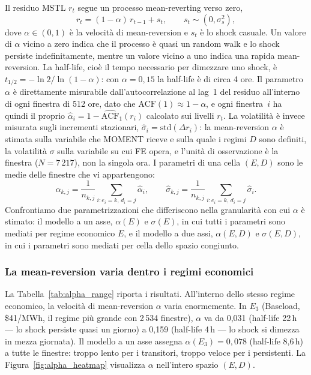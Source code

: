 \documentclass[12pt]{article}
\begin{document}
Il residuo MSTL $r_t$ segue un processo mean-reverting verso zero,
\begin{equation}
r_t = (1 - \alpha)\, r_{t-1} + s_t, \qquad s_t \sim (0, \sigma_s^2),
\label{eq:mean_reverting}
\end{equation}
dove $\alpha \in (0, 1)$ è la velocità di mean-reversion e $s_t$ è lo shock casuale.
Un valore di $\alpha$ vicino a zero indica che il processo è quasi un random walk e lo shock persiste indefinitamente, mentre un valore vicino a uno indica una rapida mean-reversion.
La half-life, cioè il tempo necessario per dimezzare uno shock, è $t_{1/2} = -\ln 2 / \ln(1-\alpha)$: con $\alpha = 0{,}15$ la half-life è di circa 4 ore.
Il parametro $\alpha$ è direttamente misurabile dall'autocorrelazione al lag~1 del residuo all'interno di ogni finestra di 512 ore, dato che $\text{ACF}(1) \approx 1 - \alpha$, e ogni finestra~$i$ ha quindi il proprio $\hat{\alpha}_i = 1 - \widehat{\text{ACF}}_1(r_i)$ calcolato sui livelli $r_t$.
La volatilità è invece misurata sugli incrementi stazionari, $\hat{\sigma}_i = \text{std}(\Delta r_i)$: la mean-reversion $\alpha$ è stimata sulla variabile che MOMENT riceve e sulla quale i regimi $D$ sono definiti, la volatilità $\sigma$ sulla variabile su cui FE opera, e l'unità di osservazione è la finestra ($N = 7\,217$), non la singola ora.
I parametri di una cella $(E, D)$ sono le medie delle finestre che vi appartengono:
\begin{equation}
\hat{\alpha}_{k,j} = \frac{1}{n_{k,j}} \sum_{i: e_i=k,\, d_i=j} \hat{\alpha}_i, \qquad
\hat{\sigma}_{k,j} = \frac{1}{n_{k,j}} \sum_{i: e_i=k,\, d_i=j} \hat{\sigma}_i.
\label{eq:cell_params}
\end{equation}
Confrontiamo due parametrizzazioni che differiscono nella granularità con cui $\alpha$ è stimato: il modello a un asse, $\alpha(E)$ e $\sigma(E)$, in cui tutti i parametri sono mediati per regime economico $E$, e il modello a due assi, $\alpha(E,D)$ e $\sigma(E,D)$, in cui i parametri sono mediati per cella dello spazio congiunto.

\subsubsection{La mean-reversion varia dentro i regimi economici}
\label{sec:alpha_variation}

La Tabella~\ref{tab:alpha_range} riporta i risultati.
All'interno dello stesso regime economico, la velocità di mean-reversion $\alpha$ varia enormemente.
In $E_3$ (Baseload, \$41/MWh, il regime più grande con 2\,534 finestre), $\alpha$ va da 0,031 (half-life 22\,h --- lo shock persiste quasi un giorno) a 0,159 (half-life 4\,h --- lo shock si dimezza in mezza giornata).
Il modello a un asse assegna $\alpha(E_3) = 0{,}078$ (half-life 8,6\,h) a tutte le finestre: troppo lento per i transitori, troppo veloce per i persistenti.
La Figura~\ref{fig:alpha_heatmap} visualizza $\alpha$ nell'intero spazio $(E, D)$.
\end{document}
